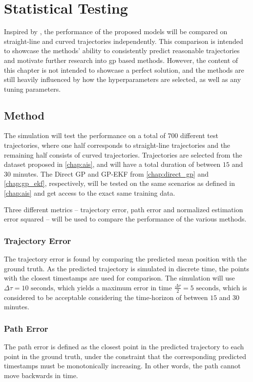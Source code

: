 \chapter{Statistical Testing}\label{chap:stat_testing}
Inspired by \cite{hexeberg}, the performance of the proposed models will be compared on straight-line and curved trajectories independently. This comparison is intended to showcase the methods' ability to consistently predict reasonable trajectories and motivate further research into \acrshort{gp} based methods. However, the content of this chapter is not intended to showcase a perfect solution, and the methods are still heavily influenced by how the hyperparameters are selected, as well as any tuning parameters.

\section{Method}

The simulation will test the performance on a total of $700$ different test trajectories, where one half corresponds to straight-line trajectories and the remaining half consists of curved trajectories. Trajectories are selected from the dataset proposed in \cref{chap:ais}, and will have a total duration of between $15$ and $30$ minutes. The Direct GP and GP-EKF from \cref{chap:direct_gp} and \cref{chap:gp_ekf}, respectively, will be tested on the same scenarios as defined in \cref{chap:ais} and get access to the exact same training data.

Three different metrics -- trajectory error, path error and normalized estimation error squared -- will be used to compare the performance of the various methods.

\subsection{Trajectory Error}
The trajectory error is found by comparing the predicted mean position with the ground truth. As the predicted trajectory is simulated in discrete time, the points with the closest timestamps are used for comparison. The simulation will use $\Delta \tau = 10\text{ seconds}$, which yields a maximum error in time $\frac{\Delta \tau}{2} = 5 \text{ seconds}$, which is considered to be acceptable considering the time-horizon of between $15$ and $30$ minutes.
\subsection{Path Error}
The path error is defined as the closest point in the predicted trajectory to each point in the ground truth, under the constraint that the corresponding predicted timestamps must be monotonically increasing. In other words, the path cannot move backwards in time.

